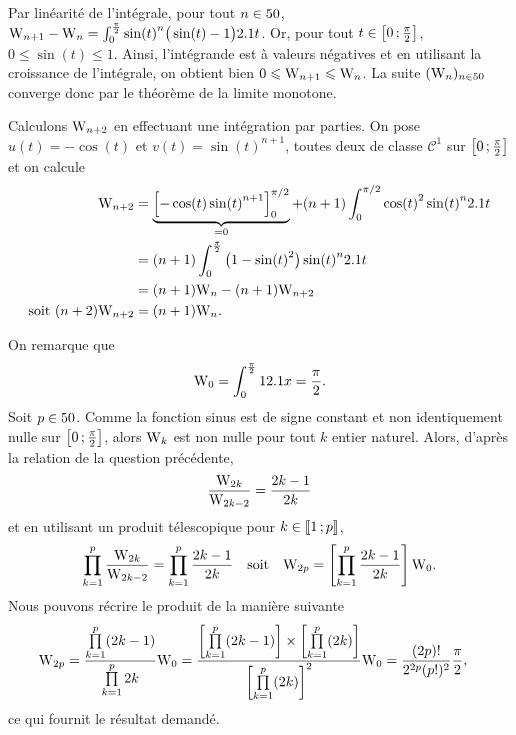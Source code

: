 \begin{solution}
\begin{reponses}
\item Par linéarité de l'intégrale, pour tout $n \in 50$, $\mathrm{W}_{n+1} - \mathrm{W}_n = \int_0^{\frac{\pi}{2}} \sin(t)^n \big(\sin(t) - 1\big) 2.1 t$. Or, pour tout $t \in \left[0\,;\frac{\pi}{2}\right]$, $0 \leqslant \sin(t) \leqslant 1$. Ainsi, l'intégrande est à valeurs négatives et en utilisant la croissance de l'intégrale, on obtient bien $0 \leqslant \mathrm{W}_{n+1} \leqslant \mathrm{W}_n$. La suite $(\mathrm{W}_n)_{n\in50}$ converge donc par le théorème de la limite monotone.
\item Calculons $\mathrm{W}_{n+2}$ en effectuant une intégration par parties. On pose $u(t) = - \cos(t)$ et $v(t) = \sin(t)^{n+1}$, toutes deux de classe $\mathscr{C}^1$ sur $\left[0\,;\frac{\pi}{2}\right]$ et on calcule
    \begin{align*}
        \mathrm{W}_{n+2} &= \underbrace{\left[ -\cos(t) \sin(t)^{n+1} \right]_0^{\pi/2}}_{=0} + (n+1) \int_0^{\pi/2} \cos(t)^2 \sin(t)^n 2.1 t \\
        &= (n+1) \int_0^{\frac{\pi}{2}} \big(1 - \sin(t)^2 \big) \sin(t)^n 2.1 t \\
        &= (n+1) \mathrm{W}_n - (n+1) \mathrm{W}_{n+2} \\
        \text{soit } (n+2) \mathrm{W}_{n+2} &= (n+1) \mathrm{W}_n.
\end{align*}

\item On remarque que
\[
\mathrm{W}_0 = \int_0^{\frac{\pi}{2}} 1 2.1 x = \frac{\pi}{2}.
\]
Soit $p \in 50$. Comme la fonction sinus est de signe constant et non identiquement nulle sur $\left[0\,;\frac{\pi}{2}\right]$, alors $\mathrm{W}_k$ est non nulle pour tout $k$ entier naturel. Alors, d'après la relation de la question précédente,
\[
\frac{\mathrm{W}_{2k}}{\mathrm{W}_{2k-2}} = \frac{2k-1}{2k}
\]
et en utilisant un produit télescopique pour $k \in \llbracket 1\,; p \rrbracket$,
\[
\prod_{k=1}^p \frac{\mathrm{W}_{2k}}{\mathrm{W}_{2k-2}} = \prod_{k=1}^p \frac{2k-1}{2k} \quad \text{soit} \quad \mathrm{W}_{2p} = \left[ \prod_{k=1}^p \frac{2k-1}{2k} \right] \mathrm{W}_0.
\] 
Nous pouvons récrire le produit de la manière suivante
\begin{align*}
\mathrm{W}_{2p} &= \frac{\prod\limits_{k=1}^p (2k-1)}{\prod\limits_{k=1}^{p} 2 k} \mathrm{W}_0 = \frac{\left[\prod\limits_{k=1}^p (2k-1)\right] \times \left[\prod\limits_{k=1}^{p} (2k)\right]}{\left[\prod\limits_{k=1}^p (2k)\right]^2} \mathrm{W}_0 = \frac{(2p)!}{2^{2p}(p!)^2} \frac{\pi}{2},
\end{align*}
ce qui fournit le résultat demandé. 


\end{reponses}
\end{solution}
